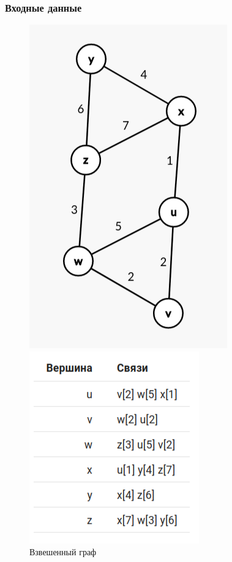 \subsubsection{Входные данные}
\begin{figure}[H]
  \begin{minipage}{0.5\textwidth}
    \centering\includegraphics[width=0.6\linewidth]{figs/task-8/graph-8.png}
  \end{minipage}
  \begin{minipage}{0.5\textwidth}
    \centering\includegraphics[width=0.6\linewidth]{figs/task-8/adj-8.png}
  \end{minipage}
  \caption{Взвешенный граф}
\end{figure}

